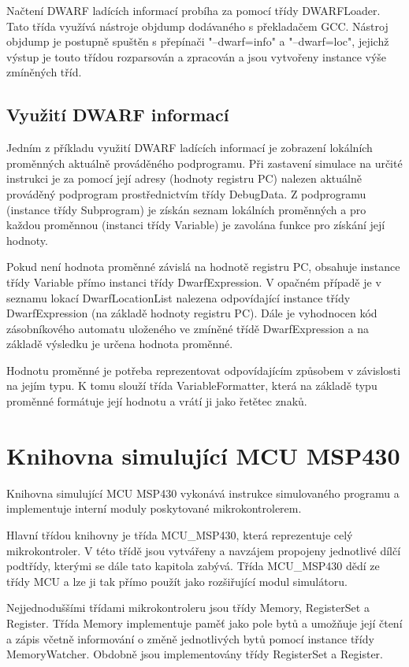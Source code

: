 Načtení DWARF ladících informací probíha za pomocí třídy DWARFLoader. Tato třída využívá nástroje objdump dodávaného s překladačem GCC. Nástroj objdump je postupně spuštěn s přepínači "--dwarf=info" a "--dwarf=loc", jejichž výstup je touto třídou rozparsován a zpracován a jsou vytvořeny instance výše zmíněných tříd.

\subsection{Využití DWARF informací}

Jedním z příkladu využití DWARF ladících informací je zobrazení lokálních proměnných aktuálně prováděného podprogramu. Při zastavení simulace na určité instrukci je za pomocí její adresy (hodnoty registru PC) nalezen aktuálně prováděný podprogram prostřednictvím třídy DebugData. Z podprogramu (instance třídy Subprogram) je získán seznam lokálních proměnných a pro každou proměnnou (instanci třídy Variable) je zavolána funkce pro získání její hodnoty.

Pokud není hodnota proměnné závislá na hodnotě registru PC, obsahuje instance třídy Variable přímo instanci třídy DwarfExpression. V opačném případě je v seznamu lokací DwarfLocationList nalezena odpovídající instance třídy DwarfExpression (na základě hodnoty registru PC). Dále je vyhodnocen kód zásobníkového automatu uloženého ve zmíněné třídě DwarfExpression a na základě výsledku je určena hodnota proměnné.

Hodnotu proměnné je potřeba reprezentovat odpovídajícím způsobem v závislosti na jejím typu. K tomu slouží třída VariableFormatter, která na základě typu proměnné formátuje její hodnotu a vrátí ji jako řetětec znaků.

\section{Knihovna simulující MCU MSP430}

Knihovna simulující MCU MSP430 vykonává instrukce simulovaného programu a implementuje interní moduly poskytované mikrokontrolerem.

Hlavní třídou knihovny je třída MCU\_MSP430, která reprezentuje celý mikrokontroler. V této třídě jsou vytvářeny a navzájem propojeny jednotlivé dílčí podtřídy, kterými se dále tato kapitola zabývá. Třída MCU\_MSP430 dědí ze třídy MCU a lze ji tak přímo použít jako rozšiřující modul simulátoru.

Nejjednoduššími třídami mikrokontroleru jsou třídy Memory, RegisterSet a Register. Třída Memory implementuje paměť jako pole bytů a umožňuje její čtení a zápis včetně informování o změně jednotlivých bytů pomocí instance třídy MemoryWatcher. Obdobně jsou implementovány třídy RegisterSet a Register.


